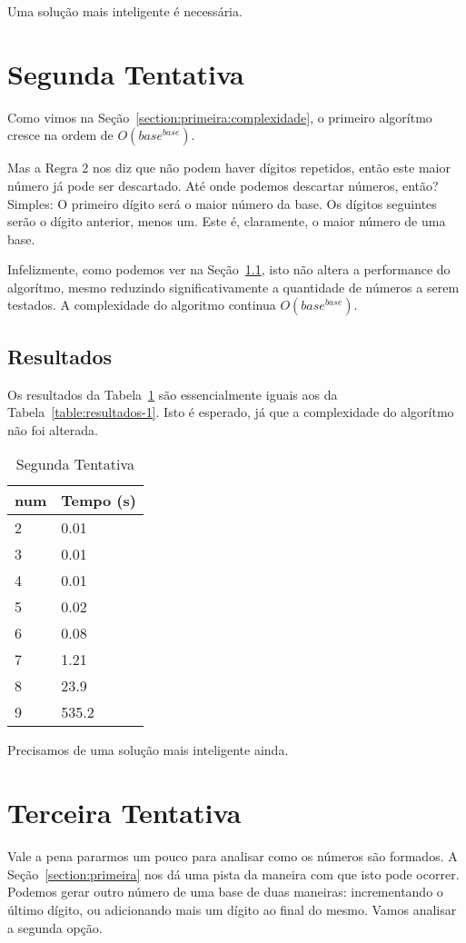 \documentclass[12pt]{article}
\begin{document}
Uma solução mais inteligente é necessária.

\section{Segunda Tentativa}\label{section:segunda}

Como vimos na Seção~\ref{section:primeira:complexidade}, o primeiro algorítmo cresce na ordem de $O(base^{base})$.

Mas a Regra 2 nos diz que não podem haver dígitos repetidos, então este maior número já pode ser descartado. Até onde podemos descartar números, então? Simples: O primeiro dígito será o maior número da base. Os dígitos seguintes serão o dígito anterior, menos um. Este é, claramente, o maior número de uma base.

Infelizmente, como podemos ver na Seção~\ref{section:segunda:resultados}, isto não altera a performance do algorítmo, mesmo reduzindo significativamente a quantidade de números a serem testados. A complexidade do algoritmo continua $O(base^{base})$.

\subsection{Resultados}\label{section:segunda:resultados}

Os resultados da Tabela~\ref{table:resultados-2} são essencialmente iguais aos da Tabela~\ref{table:resultados-1}. Isto é esperado, já que a complexidade do algorítmo não foi alterada.

\begin{table}[h]
\caption{Segunda Tentativa}
\label{table:resultados-2}
\begin{tabular}{ll}
  {\sf num} & Tempo (s) \\
  \hline
  2 & 0.01 \\
  3 & 0.01 \\
  4 & 0.01 \\
  5 & 0.02 \\
  6 & 0.08 \\
  7 & 1.21 \\
  8 & 23.9 \\
  9 & 535.2
  \end{tabular}
  \end{table}

Precisamos de uma solução mais inteligente ainda.

\section{Terceira Tentativa}\label{section:terceira}
Vale a pena pararmos um pouco para analisar como os números são formados. A Seção~\ref{section:primeira} nos dá uma pista da maneira com que isto pode ocorrer. Podemos gerar outro número de uma base de duas maneiras: incrementando o último dígito, ou adicionando mais um dígito ao final do mesmo. Vamos analisar a segunda opção.
\end{document}
